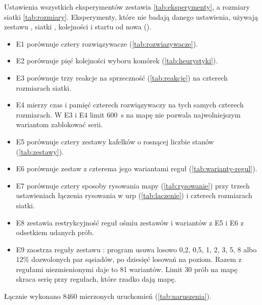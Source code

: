 Ustawienia wszystkich eksperymentów zestawia \cref{tab:eksperymenty}, a rozmiary siatki \cref{tab:rozmiary}. Eksperymenty, które nie badają danego ustawienia, używają zestawu , siatki , kolejności  i startu od nowa ().
\begin{itemize}
  \item E1 porównuje cztery rozwiązywacze (\cref{tab:rozwiazywacze}).
  \item E2 porównuje pięć kolejności wyboru komórek (\cref{tab:heurystyki}).
  \item E3 porównuje trzy reakcje na sprzeczność (\cref{tab:reakcje}) na czterech rozmiarach siatki.
  \item E4 mierzy czas i pamięć czterech rozwiązywaczy na tych samych czterech rozmiarach. W E3 i E4 limit 600~s na mapę nie pozwala najwolniejszym wariantom zablokować serii.
  \item E5 porównuje cztery zestawy kafelków o rosnącej liczbie stanów (\cref{tab:zestawy}).
  \item E6 porównuje zestaw  z czterema jego wariantami reguł (\cref{tab:warianty-regul}).
  \item E7 porównuje cztery sposoby rysowania mapy (\cref{tab:rysowanie}) przy trzech ustawieniach łączenia rysowania w \ac{urp} (\cref{tab:laczenie}) i czterech rozmiarach siatki.
  \item E8 zestawia restrykcyjność reguł ośmiu zestawów i wariantów z E5 i E6 z odsetkiem udanych prób.
  \item E9 zaostrza reguły zestawu : program usuwa losowo 0,2, 0,5, 1, 2, 3, 5, 8 albo 12\% dozwolonych par sąsiadów, po dziesięć losowań na poziom. Razem z regułami niezmienionymi daje to 81 wariantów. Limit 30 prób na mapę skraca serię przy regułach, które rzadko dają mapę.
\end{itemize}

Łącznie wykonano 8460 mierzonych uruchomień (\cref{tab:naruszenia}).

